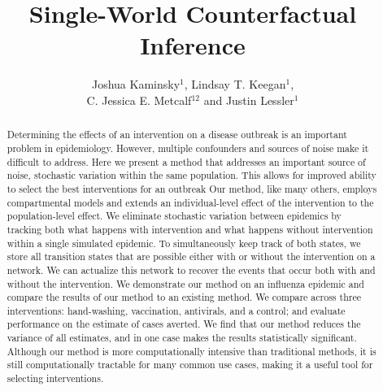 \documentclass[PTRSB]{rsos}
\title{Single-World Counterfactual Inference}
\author{%
Joshua Kaminsky$^{1}$, Lindsay T. Keegan$^{1}$,\\C. Jessica E. Metcalf$^{12}$ and Justin Lessler$^{1}$}
\begin{document}
\begin{abstract} %
  Determining the effects of an intervention on a disease outbreak is an important problem in epidemiology. %
  However, multiple confounders and sources of noise make it difficult to address. %
  Here we present a method that addresses an important source of noise, stochastic variation within the same population. %
  This allows for improved ability to select the best interventions for an outbreak %
  Our method, like many others, employs compartmental models and extends an individual-level effect of the intervention to the population-level effect. %
  We eliminate stochastic variation between epidemics by tracking both what happens with intervention and what happens without intervention within a single simulated epidemic. %
  To simultaneously keep track of both states, we store all transition states that are possible either with or without the intervention on a network. %
  We can actualize this network to recover the events that occur both with and without the intervention. %
  We demonstrate our method on an influenza epidemic and compare the results of our method to an existing method. %
  We compare across three interventions: hand-washing, vaccination, antivirals, and a control; and evaluate performance on the estimate of cases averted. %
  We find that our method reduces the variance of all estimates, and in one case makes the results statistically significant. %
  Although our method is more computationally intensive than traditional methods, it is still computationally tractable for many common use cases, making it a useful tool for selecting interventions. %
\end{abstract}



\maketitle
\end{document}
